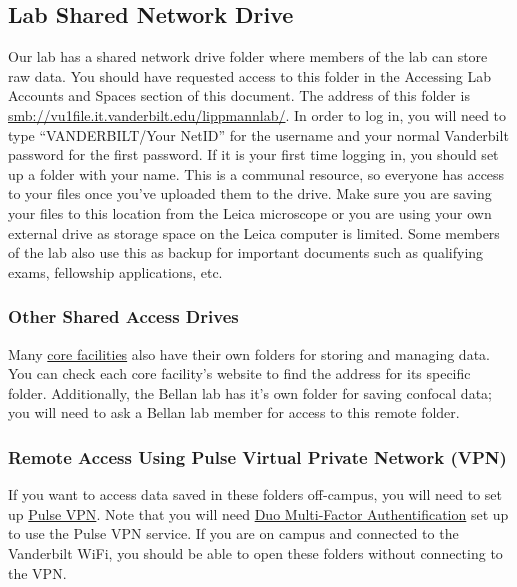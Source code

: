 \documentclass[
]{book}
\begin{document}
\hypertarget{lab-shared-network-drive}{%
\subsection{Lab Shared Network Drive}\label{lab-shared-network-drive}}

Our lab has a shared network drive folder where members of the lab can store raw data. You should have requested access to this folder in the \protect\hypertarget{access}{}{Accessing Lab Accounts and Spaces} section of this document. The address of this folder is \url{smb://vu1file.it.vanderbilt.edu/lippmannlab/}. In order to log in, you will need to type ``VANDERBILT/Your NetID'' for the username and your normal Vanderbilt password for the first password. If it is your first time logging in, you should set up a folder with your name. This is a communal resource, so everyone has access to your files once you've uploaded them to the drive. Make sure you are saving your files to this location from the Leica microscope or you are using your own external drive as storage space on the Leica computer is limited. Some members of the lab also use this as backup for important documents such as qualifying exams, fellowship applications, etc.

\hypertarget{other-shared-access-drives}{%
\subsubsection{Other Shared Access Drives}\label{other-shared-access-drives}}

Many \protect\hyperlink{corefacilities}{core facilities} also have their own folders for storing and managing data. You can check each core facility's website to find the address for its specific folder. Additionally, the Bellan lab has it's own folder for saving confocal data; you will need to ask a Bellan lab member for access to this remote folder.

\hypertarget{remote-access-using-pulse-virtual-private-network-vpn}{%
\subsubsection{Remote Access Using Pulse Virtual Private Network (VPN)}\label{remote-access-using-pulse-virtual-private-network-vpn}}

If you want to access data saved in these folders off-campus, you will need to set up \href{https://it.vanderbilt.edu/services/catalog/end-point_computing/network_access/remote-access/index.php}{Pulse VPN}. Note that you will need \protect\hyperlink{duo}{Duo Multi-Factor Authentification} set up to use the Pulse VPN service. If you are on campus and connected to the Vanderbilt WiFi, you should be able to open these folders without connecting to the VPN.
\end{document}
